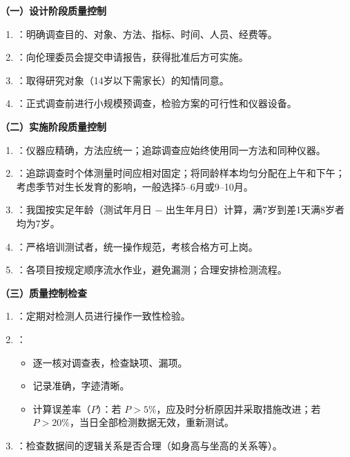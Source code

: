 \begin{keybox}
\textbf{（一）设计阶段质量控制}

\begin{enumerate}[leftmargin=*]
    \item {}：明确调查目的、对象、方法、指标、时间、人员、经费等。
    \item {}：向伦理委员会提交申请报告，获得批准后方可实施。
    \item {}：取得研究对象（14岁以下需家长）的知情同意。
    \item {}：正式调查前进行小规模预调查，检验方案的可行性和仪器设备。
\end{enumerate}

\textbf{（二）实施阶段质量控制}

\begin{enumerate}[leftmargin=*]
    \item {}：仪器应精确，方法应统一；追踪调查应始终使用同一方法和同种仪器。
    \item {}：追踪调查时个体测量时间应相对固定；将同龄样本均匀分配在上午和下午；考虑季节对生长发育的影响，一般选择5--6月或9--10月。
    \item {}：我国按实足年龄（测试年月日 $-$ 出生年月日）计算，满7岁到差1天满8岁者均为7岁。
    \item {}：严格培训测试者，统一操作规范，考核合格方可上岗。
    \item {}：各项目按规定顺序流水作业，避免漏测；合理安排检测流程。
\end{enumerate}

\textbf{（三）质量控制检查}

\begin{enumerate}[leftmargin=*]
    \item {}：定期对检测人员进行操作一致性检验。
    \item {}：
    \begin{itemize}
        \item 逐一核对调查表，检查缺项、漏项。
        \item 记录准确，字迹清晰。
        \item 计算误差率（$P$）：若 $P > 5\%$，应及时分析原因并采取措施改进；若 $P > 20\%$，当日全部检测数据无效，重新测试。
    \end{itemize}
    \item {}：检查数据间的逻辑关系是否合理（如身高与坐高的关系等）。
\end{enumerate}
\end{keybox}

